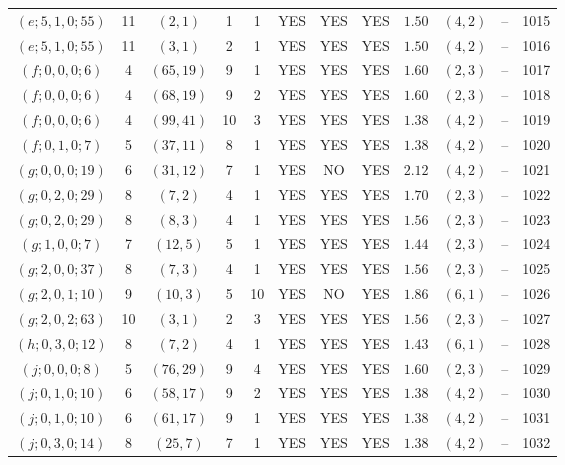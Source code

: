 \begin{longtable}{|c|c|c|c|c|c|c|c|c|c|c|c|}
$(e;5,1,0;55)$ & 11 & $(2,1)$ & 1 & 1 & YES & YES & YES & $1.50$ & $(4,2)$ & -- & 1015\\
$(e;5,1,0;55)$ & 11 & $(3,1)$ & 2 & 1 & YES & YES & YES & $1.50$ & $(4,2)$ & -- & 1016\\
$(f;0,0,0;6)$ & 4 & $(65,19)$ & 9 & 1 & YES & YES & YES & $1.60$ & $(2,3)$ & -- & 1017\\
$(f;0,0,0;6)$ & 4 & $(68,19)$ & 9 & 2 & YES & YES & YES & $1.60$ & $(2,3)$ & -- & 1018\\
$(f;0,0,0;6)$ & 4 & $(99,41)$ & 10 & 3 & YES & YES & YES & $1.38$ & $(4,2)$ & -- & 1019\\
$(f;0,1,0;7)$ & 5 & $(37,11)$ & 8 & 1 & YES & YES & YES & $1.38$ & $(4,2)$ & -- & 1020\\
$(g;0,0,0;19)$ & 6 & $(31,12)$ & 7 & 1 & YES & NO & YES & $2.12$ & $(4,2)$ & -- & 1021\\
$(g;0,2,0;29)$ & 8 & $(7,2)$ & 4 & 1 & YES & YES & YES & $1.70$ & $(2,3)$ & -- & 1022\\
$(g;0,2,0;29)$ & 8 & $(8,3)$ & 4 & 1 & YES & YES & YES & $1.56$ & $(2,3)$ & -- & 1023\\
$(g;1,0,0;7)$ & 7 & $(12,5)$ & 5 & 1 & YES & YES & YES & $1.44$ & $(2,3)$ & -- & 1024\\
$(g;2,0,0;37)$ & 8 & $(7,3)$ & 4 & 1 & YES & YES & YES & $1.56$ & $(2,3)$ & -- & 1025\\
$(g;2,0,1;10)$ & 9 & $(10,3)$ & 5 & 10 & YES & NO & YES & $1.86$ & $(6,1)$ & -- & 1026\\
$(g;2,0,2;63)$ & 10 & $(3,1)$ & 2 & 3 & YES & YES & YES & $1.56$ & $(2,3)$ & -- & 1027\\
$(h;0,3,0;12)$ & 8 & $(7,2)$ & 4 & 1 & YES & YES & YES & $1.43$ & $(6,1)$ & -- & 1028\\
$(j;0,0,0;8)$ & 5 & $(76,29)$ & 9 & 4 & YES & YES & YES & $1.60$ & $(2,3)$ & -- & 1029\\
$(j;0,1,0;10)$ & 6 & $(58,17)$ & 9 & 2 & YES & YES & YES & $1.38$ & $(4,2)$ & -- & 1030\\
$(j;0,1,0;10)$ & 6 & $(61,17)$ & 9 & 1 & YES & YES & YES & $1.38$ & $(4,2)$ & -- & 1031\\
$(j;0,3,0;14)$ & 8 & $(25,7)$ & 7 & 1 & YES & YES & YES & $1.38$ & $(4,2)$ & -- & 1032
\end{longtable}
